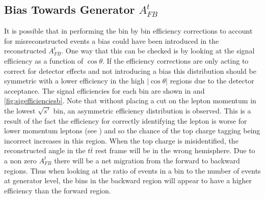 \subsection{Bias Towards Generator $A_{FB}^t$}

It is possible that in performing the bin by bin efficiency corrections to account for misreconstructed events a bias could have been introduced in the reconstructed $A_{FB}^t$. One way that this can be checked is by looking at the signal efficiency as a function of $\cos\theta$. If the efficiency corrections are only acting to correct for detector effects and not introducing a bias this distribution should be symmetric with a lower efficiency in the high $|\cos\theta|$ regions due to the detector acceptance. The signal efficiencies for each bin are shown in  and \ref{fig:sigefficienciesb}. Note that without placing a cut on the lepton momentum in the lowest $\sqrt{s'}$ bin, an asymmetric efficiency distribution is observed. This is a result of the fact the efficiency for correctly identifying the lepton is worse for lower momentum leptons (see ) and so the chance of the top charge tagging being incorrect increases in this region. When the top charge is misidentified, the reconstructed angle in the $t\bar{t}$ rest frame will be in the wrong hemisphere. Due to a non zero $A_{FB}^t$ there will be a net migration from the forward to backward regions. Thus when looking at the ratio of events in a bin to the number of events at generator level, the bins in the backward region will appear to have a higher efficiency than the forward region.

